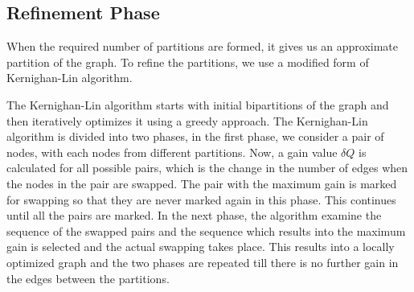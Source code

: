 \documentclass[letterpaper]{article}
\begin{document}
 
\subsection{Refinement Phase}
When the required number of partitions are formed, it gives us an approximate
partition of the graph. To refine the partitions, we use a modified form of
Kernighan-Lin algorithm\cite{22}.


    The Kernighan-Lin algorithm starts with initial bipartitions of the graph
and then iteratively optimizes it using a greedy approach. The Kernighan-Lin
algorithm is divided into two phases, in the first phase, we consider a pair of
nodes, with each nodes from different partitions. Now, a gain value $\delta$$Q$
is calculated for all possible pairs, which is the change in the number of
edges when the nodes in the pair are swapped. The pair with the maximum  gain
is marked for swapping so that they are never marked again in this phase. This
continues until all the pairs are marked. In the next phase, the algorithm
examine the sequence of the swapped pairs and the sequence which results into
the maximum gain is selected and the actual swapping takes place. This results
into a locally optimized graph and the two phases are repeated till there is no
further gain in the edges between the partitions.
\end{document}
